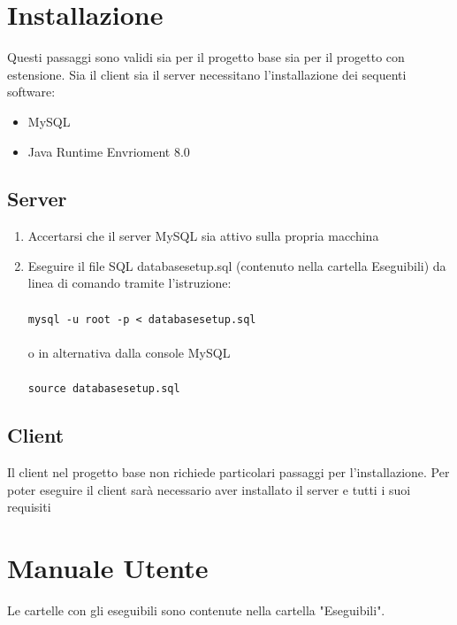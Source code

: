 \documentclass{article}
\begin{document}
    \newpage
    \section{Installazione}
    Questi passaggi sono validi sia per il progetto base sia per il progetto con
    estensione.
    Sia il client sia il server necessitano l'installazione dei sequenti
    software:
        \begin{itemize}
            \item MySQL
            \item Java Runtime Envrioment 8.0
        \end{itemize}

        \subsection{Server}
            \begin{enumerate}
                \item Accertarsi che il server MySQL sia attivo sulla propria
                macchina
                \item Eseguire il file SQL databasesetup.sql 
                (contenuto nella cartella Eseguibili)
                da linea di comando tramite l'istruzione:
                    \\\\
                    \verb|mysql -u root -p < databasesetup.sql| \\\\
                    o in alternativa dalla console MySQL \\\\
                    \verb|source databasesetup.sql|
                
                
            \end{enumerate}

        \subsection{Client}
        Il client nel progetto base non
        richiede particolari passaggi per l'installazione. Per poter eseguire il 
        client sarà necessario aver installato il server e tutti i suoi
         requisiti
    
    \section{Manuale Utente}
    Le cartelle con gli eseguibili sono contenute nella cartella "Eseguibili".
   
\end{document}
